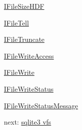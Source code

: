 \begin{DoxyItemize}
\hyperlink{ifile_8h_af1a575404e6e3648952ae70d281b3552}{I\+File\+Size\+H\+D\+F} \item \hyperlink{ifile_8h_abba9b29cbd1df9a22516366c96c528fa}{I\+File\+Tell} \item \hyperlink{ifile_8h_af18bb2cd94833d1f8f7176d12537695c}{I\+File\+Truncate} \item \hyperlink{ifile_8h_a1b9797ae1226f5e7dc952e6686adfd8c}{I\+File\+Write\+Access} \item \hyperlink{ifile_8h_af21affaf53c0b66911c745dd6248ccf7}{I\+File\+Write} \item \hyperlink{ifile_8h_a04c255b65dccaf71c2e826a3ecfbd3ee}{I\+File\+Write\+Status} \item \hyperlink{ifile_8h_ae2d81157c93e90f61645886bc82f4c8f}{I\+File\+Write\+Status\+Message}\end{DoxyItemize}
next\+: \hyperlink{vfs_library}{sqlite3 vfs} 